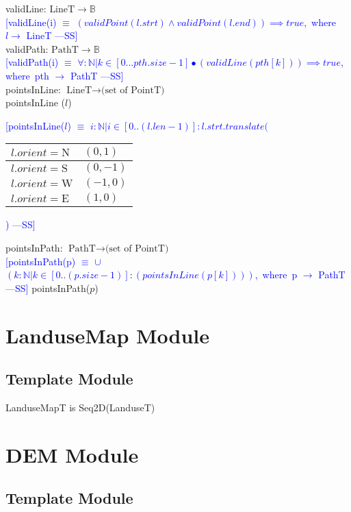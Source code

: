 \documentclass[12pt]{article}
\newcommand{\authornote}[3]{\textcolor{#1}{[#3 ---#2]}}
\newcommand{\authornote}[3]{}
\newcommand{\wss}[1]{\authornote{blue}{SS}{#1}}
\begin{document}
\noindent validLine: $\mbox{LineT} \rightarrow \mathbb{B}$\\
\noindent \wss{validLine(i) $\equiv$ $(validPoint(l.strt) \land validPoint(l.end))  \implies true$,\, where\, $l \rightarrow$ LineT}\\

\noindent validPath: $\mbox{PathT} \rightarrow \mathbb{B}$\\
\noindent \wss{validPath(i) $\equiv$ $\forall : \mathbb{N} | k \in [0...pth.size - 1] \bullet (validLine(pth[k])) \implies true$,\, where\, pth $\rightarrow$ PathT}\\

\noindent pointsInLine: $\mbox{LineT} \rightarrow \mbox{(set of PointT)}$\\
\noindent pointsInLine ($l$) 
\wss{pointsInLine($l$) $\equiv$  $i: \mathbb{N} | i \in [0 .. (l.len - 1)] : l.strt.translate($ \begin{tabular}{|l|l|}
\hline
$l.orient = \mbox{N}$ & $(0,1)$\\
\hline
$l.orient = \mbox{S}$ & $(0,-1)$\\
\hline
$l.orient = \mbox{W}$ & $(-1,0)$\\
\hline
$l.orient = \mbox{E}$ & $(1,0)$\\
\hline
\end{tabular})}

\noindent pointsInPath: $\mbox{PathT} \rightarrow \mbox{(set of PointT)}$\\
\wss{pointsInPath(p) $\equiv$ $\cup$$(k: \mathbb{N} | k \in [0 .. (p.size - 1)] : (pointsInLine(p[k])))$,\, where\, p $\rightarrow$ PathT}
\noindent pointsInPath($p$) 

\newpage

\section* {LanduseMap Module}

\subsection* {Template Module}

LanduseMapT is Seq2D(LanduseT)

\section* {DEM Module}

\subsection* {Template Module}
\end{document}
